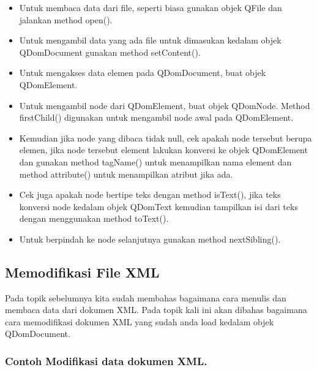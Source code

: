 \begin{itemize}

\item
  Untuk membaca data dari file, seperti biasa gunakan objek QFile dan
  jalankan method open().
\item
  Untuk mengambil data yang ada file untuk dimasukan kedalam objek
  QDomDocument gunakan method setContent().
\item
  Untuk mengakses data elemen pada QDomDocument, buat objek QDomElement.
\item
  Untuk mengambil node dari QDomElement, buat objek QDomNode. Method
  firstChild() digunakan untuk mengambil node awal pada QDomElement.
\item
  Kemudian jika node yang dibaca tidak null, cek apakah node tersebut
  berupa elemen, jika node tersebut element lakukan konversi ke objek
  QDomElement dan gunakan method tagName() untuk menampilkan nama
  element dan method attribute() untuk menampilkan atribut jika ada.
\item
  Cek juga apakah node bertipe teks dengan method isText(), jika teks
  konversi node kedalam objek QDomText kemudian tampilkan isi dari teks
  dengan menggunakan method toText().
\item
  Untuk berpindah ke node selanjutnya gunakan method nextSibling().
\end{itemize}

\subsection{Memodifikasi File XML}\label{memodifikasi-file-xml}

Pada topik sebelumnya kita sudah membahas bagaimana cara menulis dan
membaca data dari dokumen XML. Pada topik kali ini akan dibahas
bagaimana cara memodifikasi dokumen XML yang sudah anda load kedalam
objek QDomDocument.

\subsubsection*{Contoh  Modifikasi data dokumen XML.}

